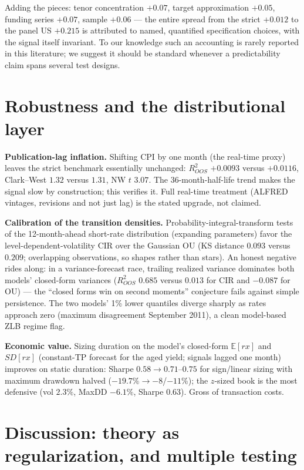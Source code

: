 \documentclass[11pt]{article}
\newcommand{\E}{\mathbb{E}}
\begin{document}
Adding the pieces: tenor concentration $+0.07$, target approximation $+0.05$, funding
series $+0.07$, sample $+0.06$ --- the entire spread from the strict $+0.012$ to the panel
US $+0.215$ is attributed to named, quantified specification choices, with the signal
itself invariant. To our knowledge such an accounting is rarely reported in this
literature; we suggest it should be standard whenever a predictability claim spans several
test designs.

\section{Robustness and the distributional layer}\label{sec:robust}

\textbf{Publication-lag inflation.} Shifting CPI by one month (the real-time proxy) leaves
the strict benchmark essentially unchanged: $R^2_{OOS}$ $+0.0093$ versus $+0.0116$,
Clark--West $1.32$ versus $1.31$, NW $t$ $3.07$. The 36-month-half-life trend makes the
signal slow by construction; this verifies it. Full real-time treatment (ALFRED vintages,
revisions and not just lag) is the stated upgrade, not claimed.

\textbf{Calibration of the transition densities.} Probability-integral-transform tests of
the 12-month-ahead short-rate distribution (expanding parameters) favor the
level-dependent-volatility CIR over the Gaussian OU (KS distance $0.093$ versus $0.209$;
overlapping observations, so shapes rather than stars). An honest negative rides along:
in a variance-forecast race, trailing realized variance dominates both models'
closed-form variances ($R^2_{OOS}$ $0.685$ versus $0.013$ for CIR and $-0.087$ for OU) ---
the ``closed forms win on second moments'' conjecture fails against simple persistence.
The two models' 1\% lower quantiles diverge sharply as rates approach zero (maximum
disagreement September 2011), a clean model-based ZLB regime flag.

\textbf{Economic value.} Sizing duration on the model's closed-form $\E[rx]$ and $SD[rx]$
(constant-TP forecast for the aged yield; signals lagged one month) improves on static
duration: Sharpe $0.58\to 0.71$--$0.75$ for sign/linear sizing with maximum drawdown
halved ($-19.7\%\to -8$/$-11\%$); the $z$-sized book is the most defensive
(vol $2.3\%$, MaxDD $-6.1\%$, Sharpe $0.63$). Gross of transaction costs.

\section{Discussion: theory as regularization, and multiple testing}\label{sec:disc}
\end{document}
